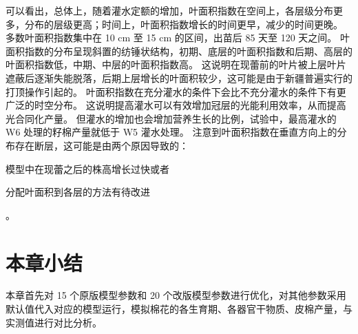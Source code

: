 可以看出，总体上，随着灌水定额的增加，叶面积指数在空间上，各层级分布更多，分布的层级更高；时间上，叶面积指数增长的时间更早，减少的时间更晚。%
多数叶面积指数集中在 10 cm 至 15 cm 的区间，出苗后 85 天至 120 天之间。%
叶面积指数的分布呈现斜置的纺锤状结构，初期、底层的叶面积指数和后期、高层的叶面积指数低，中期、中层的叶面积指数高。%
这说明在现蕾前的叶片被上层叶片遮蔽后逐渐失能脱落，后期上层增长的叶面积较少，这可能是由于新疆普遍实行的打顶操作引起的。%
叶面积指数在充分灌水的条件下会比不充分灌水的条件下有更广泛的时空分布。%
这说明提高灌水可以有效增加冠层的光能利用效率，从而提高光合同化产量。%
但灌水的增加也会增加营养生长的比例，试验中，最高灌水的 W6 处理的籽棉产量就低于 W5 灌水处理。
注意到叶面积指数在垂直方向上的分布存在断层，这可能是由两个原因导致的：\begin{enumerate*}
    \item 模型中在现蕾之后的株高增长过快或者
    \item 分配叶面积到各层的方法有待改进
\end{enumerate*}。

\section{本章小结}
本章首先对 15 个原版模型参数和 20 个改版模型参数进行优化，对其他参数采用默认值代入对应的模型运行，模拟棉花的各生育期、各器官干物质、皮棉产量，与实测值进行对比分析。%
